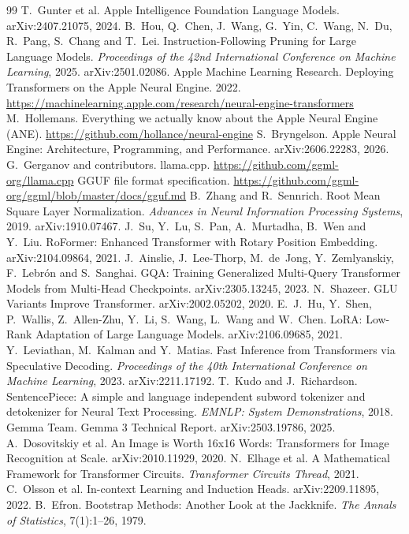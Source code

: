 \documentclass[11pt,reqno]{amsart}
\theoremstyle{definition}
\begin{document}
\begin{thebibliography}{99}\small
{} T.~Gunter et al. Apple Intelligence Foundation Language Models. arXiv:2407.21075, 2024.
 B.~Hou, Q.~Chen, J.~Wang, G.~Yin, C.~Wang, N.~Du, R.~Pang, S.~Chang and T.~Lei. Instruction-Following Pruning for Large Language Models. \emph{Proceedings of the 42nd International Conference on Machine Learning}, 2025. arXiv:2501.02086.
 Apple Machine Learning Research. Deploying Transformers on the Apple Neural Engine. 2022. \url{https://machinelearning.apple.com/research/neural-engine-transformers}
 M.~Hollemans. Everything we actually know about the Apple Neural Engine (ANE). \url{https://github.com/hollance/neural-engine}
 S.~Bryngelson. Apple Neural Engine: Architecture, Programming, and Performance. arXiv:2606.22283, 2026.
 G.~Gerganov and contributors. llama.cpp. \url{https://github.com/ggml-org/llama.cpp}
 GGUF file format specification. \url{https://github.com/ggml-org/ggml/blob/master/docs/gguf.md}
 B.~Zhang and R.~Sennrich. Root Mean Square Layer Normalization. \emph{Advances in Neural Information Processing Systems}, 2019. arXiv:1910.07467.
 J.~Su, Y.~Lu, S.~Pan, A.~Murtadha, B.~Wen and Y.~Liu. RoFormer: Enhanced Transformer with Rotary Position Embedding. arXiv:2104.09864, 2021.
 J.~Ainslie, J.~Lee-Thorp, M.~de~Jong, Y.~Zemlyanskiy, F.~Lebr\'on and S.~Sanghai. GQA: Training Generalized Multi-Query Transformer Models from Multi-Head Checkpoints. arXiv:2305.13245, 2023.
 N.~Shazeer. GLU Variants Improve Transformer. arXiv:2002.05202, 2020.
 E.~J.~Hu, Y.~Shen, P.~Wallis, Z.~Allen-Zhu, Y.~Li, S.~Wang, L.~Wang and W.~Chen. LoRA: Low-Rank Adaptation of Large Language Models. arXiv:2106.09685, 2021.
 Y.~Leviathan, M.~Kalman and Y.~Matias. Fast Inference from Transformers via Speculative Decoding. \emph{Proceedings of the 40th International Conference on Machine Learning}, 2023. arXiv:2211.17192.
 T.~Kudo and J.~Richardson. SentencePiece: A simple and language independent subword tokenizer and detokenizer for Neural Text Processing. \emph{EMNLP: System Demonstrations}, 2018.
 Gemma Team. Gemma 3 Technical Report. arXiv:2503.19786, 2025.
 A.~Dosovitskiy et al. An Image is Worth 16x16 Words: Transformers for Image Recognition at Scale. arXiv:2010.11929, 2020.
 N.~Elhage et al. A Mathematical Framework for Transformer Circuits. \emph{Transformer Circuits Thread}, 2021.
 C.~Olsson et al. In-context Learning and Induction Heads. arXiv:2209.11895, 2022.
 B.~Efron. Bootstrap Methods: Another Look at the Jackknife. \emph{The Annals of Statistics}, 7(1):1--26, 1979.
\end{thebibliography}
\end{document}
